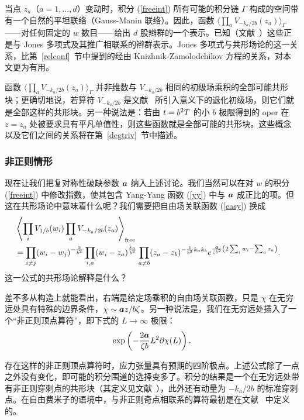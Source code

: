 当点 $z_a$（$a=1,\dots,d$）变动时，积分 (\ref{freeint}) 所有可能的积分链 $\Gamma$ 构成的空间带有一个自然的平坦联络（Gauss-Manin 联络）。因此，函数 $\langle  \prod_a  V_{-k_a/2b}(z_a)
\rangle_\Gamma$——对任何固定的 $w$ 数目——给出 $d$ 股辫群的一个表示。已知（文献~\cite{Lawrence,SV}）这些正是与 Jones 多项式及其推广相联系的辫群表示。Jones 多项式与共形场论的这一关系，比第~\ref{relconf}~节中提到的经由 Knizhnik-Zamolodchikov 方程的关系，对本文更为有用。

函数 $\langle  \prod_a  V_{-k_a/2b}(z_a)
\rangle_\Gamma$ 并非维数与 $V_{-k_a/2b}$ 相同的初级场乘积的全部可能共形块；更确切地说，若算符 $V_{-k_a/2b}$ 是文献~\cite{BPZ} 所引入意义下的退化初级场，则它们就是全部这样的共形块。另一种说法是：若由 ${{t}}=b^2T$ 的小 $b$ 极限得到的 oper 在 $z=z_a$ 处被要求具有平凡单值性，则这些函数就是全部可能的共形块。这些概念以及它们之间的关系将在第~\ref{degtriv}~节中描述。

\subsubsection{非正则情形}\label{irreg}

现在让我们把复对称性破缺参数 ${\boldsymbol{a}}$ 纳入上述讨论。我们当然可以在对 $w$ 的积分 (\ref{freeint}) 中修改指数，使其包含 Yang-Yang 函数 (\ref{yy}) 中与 ${\boldsymbol{a}}$ 成正比的项。但这在共形场论中意味着什么呢？我们需要把自由场关联函数 (\ref{easy}) 换成
\begin{align}\label{oddball}
&\left\langle \prod_i
V_{1/b}(w_i)  \prod_a   V_{-k_a/2b}(z_a) \right \rangle_{\mathrm{free}}  \cr & =
\prod_{i \neq j}(w_i - w_j)^{-\frac{2}{b^2}}\prod_{i,a}(w_i - z_a)^{\frac{k_a}{b^2}}
\prod_{a \neq b}(z_a - z_b)^{-\frac{1}{b^2}k_a k_b}
e^{\frac{{\boldsymbol{a}}}{\zeta b^2}
 \left( 2 \sum_i w_i - \sum_a z_a  \right)}.
 \end{align}
这一公式的共形场论解释是什么？

差不多从构造上就能看出，右端是给定场乘积的自由场关联函数，只是 $\chi$ 在无穷远处具有特殊的边界条件，$\chi \sim {{\boldsymbol{a}}z}/{b \zeta} $。另一种说法是，我们在无穷远处插入了一个“非正则顶点算符”，即下式的 $L \to \infty$ 极限：
\begin{equation}
\exp\left({-\frac{2{\boldsymbol{a}}}{\zeta b} L^2 \partial \chi(L) }\right).
\end{equation}


存在这样的非正则顶点算符时，应力张量具有预期的四阶极点。上述公式除了一点之外没有变化，即可能的积分围道的选择变多了。积分的结果是一个在无穷远处带有非正则穿刺点的共形块（其定义见文献~\cite{G}），此外还有动量为 $-{k_a}/{2 b}$ 的标准穿刺点。在自由费米子的语境中，与非正则奇点相联系的算符最初是在文献~\cite{Miwa,Moore} 中定义的。
